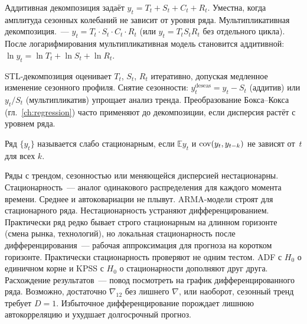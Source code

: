 Аддитивная декомпозиция задаёт $y_t=T_t+S_t+C_t+R_t$.
Уместна, когда амплитуда сезонных колебаний не зависит от уровня ряда.
Мультипликативная декомпозиция.~--- $y_t=T_t\cdot S_t\cdot C_t\cdot R_t$ (или $y_t=T_t S_t R_t$ без отдельного цикла).
После логарифмирования мультипликативная модель становится аддитивной: $\ln y_t=\ln T_t+\ln S_t+\ln R_t$.

STL-декомпозиция оценивает $T_t$, $S_t$, $R_t$ итеративно, допуская медленное изменение сезонного профиля.
Снятие сезонности: $y_t^{\mathrm{deseas}}=y_t-S_t$ (аддитив) или $y_t/S_t$ (мультипликатив) упрощает анализ тренда.
Преобразование Бокса--Кокса (гл.~\ref{ch:regression}) часто применяют до декомпозиции, если дисперсия растёт с уровнем ряда.

\begin{definition}
Ряд $\{y_t\}$ называется слабо стационарным, если $\mathbb{E}y_t$ и $\operatorname{cov}(y_t,y_{t-k})$ не зависят от~$t$ для всех $k$.
\end{definition}

Ряды с трендом, сезонностью или меняющейся дисперсией нестационарны.
Стационарность~--- аналог одинакового распределения для каждого момента времени. Среднее и автоковариации не плывут.
ARMA-модели строят для стационарного ряда. Нестационарность устраняют дифференцированием.
Практически ряд редко бывает строго стационарным на длинном горизонте (смена рынка, технологий), но локальная стационарность после дифференцирования~--- рабочая аппроксимация для прогноза на коротком горизонте.
Практически стационарность проверяют не одним тестом. ADF с $H_0$ о единичном корне и KPSS с $H_0$ о стационарности дополняют друг друга. Расхождение результатов~--- повод посмотреть на график дифференцированного ряда. Возможно, достаточно $\nabla_{12}$ без лишнего $\nabla$, или наоборот, сезонный тренд требует $D=1$.
Избыточное дифференцирование порождает лишнюю автокорреляцию и ухудшает долгосрочный прогноз.

